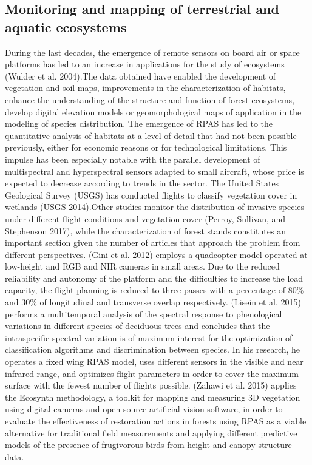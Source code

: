 \documentclass[]{interact}
\theoremstyle{plain}%
\theoremstyle{definition}
\theoremstyle{remark}
\begin{document}
\subsection{Monitoring and mapping of terrestrial and aquatic
ecosystems}\label{monitoring-and-mapping-of-terrestrial-and-aquatic-ecosystems}

During the last decades, the emergence of remote sensors on board air or
space platforms has led to an increase in applications for the study of
ecosystems (Wulder et al. 2004).The data obtained have enabled the
development of vegetation and soil maps, improvements in the
characterization of habitats, enhance the understanding of the structure
and function of forest ecosystems, develop digital elevation models or
geomorphological maps of application in the modeling of species
distribution. The emergence of RPAS has led to the quantitative analysis
of habitats at a level of detail that had not been possible previously,
either for economic reasons or for technological limitations. This
impulse has been especially notable with the parallel development of
multispectral and hyperspectral sensors adapted to small aircraft, whose
price is expected to decrease according to trends in the sector. The
United States Geological Survey (USGS) has conducted flights to classify
vegetation cover in wetlands (USGS 2014).Other studies monitor the
distribution of invasive species under different flight conditions and
vegetation cover (Perroy, Sullivan, and Stephenson 2017), while the
characterization of forest stands constitutes an important section given
the number of articles that approach the problem from different
perspectives. (Gini et al. 2012) employs a quadcopter model operated at
low-height and RGB and NIR cameras in small areas. Due to the reduced
reliability and autonomy of the platform and the difficulties to
increase the load capacity, the flight planning is reduced to three
passes with a percentage of 80\% and 30\% of longitudinal and transverse
overlap respectively. (Lisein et al. 2015) performs a multitemporal
analysis of the spectral response to phenological variations in
different species of deciduous trees and concludes that the
intraspecific spectral variation is of maximum interest for the
optimization of classification algorithms and discrimination between
species. In his research, he operates a fixed wing RPAS model, uses
different sensors in the visible and near infrared range, and optimizes
flight parameters in order to cover the maximum surface with the fewest
number of flights possible. (Zahawi et al. 2015) applies the Ecosynth
methodology, a toolkit for mapping and measuring 3D vegetation using
digital cameras and open source artificial vision software, in order to
evaluate the effectiveness of restoration actions in forests using RPAS
as a viable alternative for traditional field measurements and applying
different predictive models of the presence of frugivorous birds from
height and canopy structure data.
\end{document}
